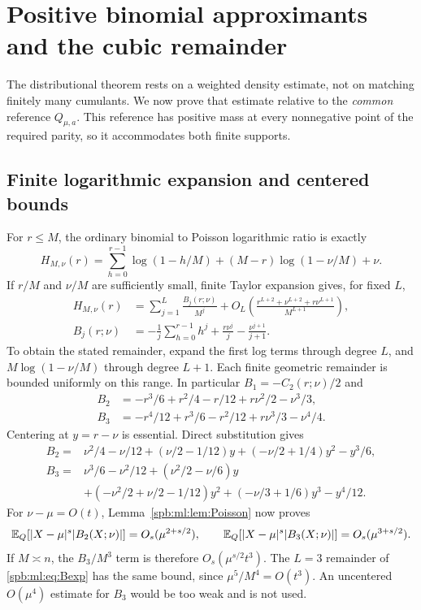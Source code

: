 \section{Positive binomial approximants and the cubic remainder}\label{spb:ml:sec:binomial}
The distributional theorem rests on a weighted density estimate, not on matching finitely many cumulants. We now prove that estimate relative to the \emph{common} reference $Q_{\mu,a}$. This reference has positive mass at every nonnegative point of the required parity, so it accommodates both finite supports.

\subsection{Finite logarithmic expansion and centered bounds}
For $r\le M$, the ordinary binomial to Poisson logarithmic ratio is exactly
\begin{equation}\label{spb:ml:eq:H}
 H_{M,\nu}(r)=\sum_{h=0}^{r-1}\log(1-h/M)
                  +(M-r)\log(1-\nu/M)+\nu.
\end{equation}
If $r/M$ and $\nu/M$ are sufficiently small, finite Taylor expansion gives, for fixed $L$,
\begin{align}
 H_{M,\nu}(r)&=\sum_{j=1}^L\frac{B_j(r;\nu)}{M^j}
 +O_L\left(\frac{r^{L+2}+\nu^{L+2}+r\nu^{L+1}}{M^{L+1}}\right),\label{spb:ml:eq:Bexp}\\
 B_j(r;\nu)&=-\frac1j\sum_{h=0}^{r-1}h^j+
                  \frac{r\nu^j}{j}-\frac{\nu^{j+1}}{j+1}.\label{spb:ml:eq:Bj}
\end{align}
To obtain the stated remainder, expand the first log terms through degree $L$, and $M\log(1-\nu/M)$ through degree $L+1$. Each finite geometric remainder is bounded uniformly on this range. In particular $B_1=-C_2(r;\nu)/2$ and
\begin{align}
 B_2&=-r^3/6+r^2/4-r/12+r\nu^2/2-\nu^3/3,\nonumber\\
 B_3&=-r^4/12+r^3/6-r^2/12+r\nu^3/3-\nu^4/4.\label{spb:ml:eq:B23}
\end{align}
Centering at $y=r-\nu$ is essential. Direct substitution gives
\begin{align}
 B_2={}&\nu^2/4-\nu/12+(\nu/2-1/12)y
                      +(-\nu/2+1/4)y^2-y^3/6,\label{spb:ml:eq:B2center}\\
 B_3={}&\nu^3/6-\nu^2/12+(\nu^2/2-\nu/6)y\nonumber\\
       &+(-\nu^2/2+\nu/2-1/12)y^2+(-\nu/3+1/6)y^3-y^4/12.\label{spb:ml:eq:B3center}
\end{align}
For $\nu-\mu=O(t)$, Lemma~\ref{spb:ml:lem:Poisson} now proves
\begin{equation}\label{spb:ml:eq:Bbounds}
 \mathbb E_Q[|X-\mu|^s|B_2(X;\nu)|]=O_s(\mu^{2+s/2}),\qquad
 \mathbb E_Q[|X-\mu|^s|B_3(X;\nu)|]=O_s(\mu^{3+s/2}).
\end{equation}
If $M\asymp n$, the $B_3/M^3$ term is therefore $O_s(\mu^{s/2}t^3)$. The $L=3$ remainder of \eqref{spb:ml:eq:Bexp} has the same bound, since $\mu^5/M^4=O(t^3)$. An uncentered $O(\mu^4)$ estimate for $B_3$ would be too weak and is not used.

